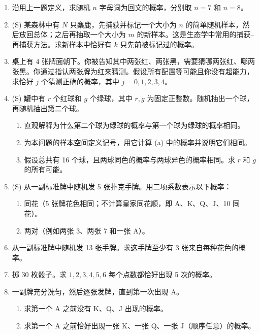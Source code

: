\documentclass[UTF8, 12pt, fontset=fandol, oneside]{ctexart}
\begin{document}
\begin{enumerate}
  \item 沿用上一题定义，求随机 $n$ 字母词为回文的概率，分别取 $n=7$ 和 $n=8$。

  \item (S) 某森林中有 $N$ 只麋鹿，先捕获并标记一个大小为 $n$ 的简单随机样本，然后放回总体；之后再抽取一个大小为 $m$ 的新样本。这是生态学中常用的捕获--再捕获方法。求新样本中恰好有 $k$ 只先前被标记过的概率。

  \item 桌上有 4 张牌面朝下。你被告知其中两张红、两张黑，需要猜哪两张红、哪两张黑。你通过指认两张牌为红来猜测。假设所有配置等可能且你没有超能力，求恰好 $j$ 个猜测正确的概率，其中 $j=0,1,2,3,4$。

  \item (S) 罐中有 $r$ 个红球和 $g$ 个绿球，其中 $r,g$ 为固定正整数。随机抽出一个球，再随机抽出第二个球。
  \begin{enumerate}
    \item 直观解释为什么第二个球为绿球的概率与第一个球为绿球的概率相同。
    \item 为本问题的样本空间定义记号，用它计算 (a) 中的概率并说明它们相同。
    \item 假设总共有 16 个球，且两球同色的概率与两球异色的概率相同。求 $r$ 和 $g$ 的所有可能。
  \end{enumerate}

  \item (S) 从一副标准牌中随机发 5 张扑克手牌。用二项系数表示以下概率：
  \begin{enumerate}
    \item 同花（5 张牌花色相同；不计算皇家同花顺，即 A、K、Q、J、10 同花）。
    \item 两对（例如两张 3、两张 7 和一张 A）。
  \end{enumerate}

  \item 从一副标准牌中随机发 13 张手牌。求这手牌至少有 3 张来自每种花色的概率。

  \item 掷 30 枚骰子。求 $1,2,3,4,5,6$ 每个点数都恰好出现 5 次的概率。

  \item 一副牌充分洗匀，然后逐张发牌，直到第一次出现 A。
  \begin{enumerate}
    \item 求第一个 A 之前没有 K、Q、J 出现的概率。
    \item 求第一个 A 之前恰好出现一张 K、一张 Q、一张 J（顺序任意）的概率。
  \end{enumerate}


\end{enumerate}
\end{document}
